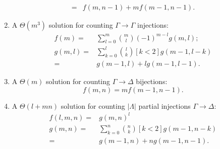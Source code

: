 \documentclass{article}
\begin{document}
\begin{enumerate}
\begin{align*}
          ={}& f(m, n-1) + mf(m-1, n-1).
        \end{align*}
  \item A $\Theta(m^{3})$ solution for counting $\Gamma \to \Gamma$ injections:
        \begin{align*}
          f(m) ={}& \sum_{l=0}^{m} \binom{m}{l} {(-1)}^{m-l} g(m, l); \\
          g(m, l) ={}& \sum_{k=0}^{l} \binom{l}{k} [k < 2] g(m - 1, l - k)\\
          ={}& g(m - 1, l) + lg(m - 1, l - 1).
        \end{align*}
  \item A $\Theta(m)$ solution for counting $\Gamma \to \Delta$ bijections:
        \[
        f(m, n) = mf(m-1, n-1).
        \]
  \item A $\Theta(l+mn)$ solution for counting $|\Lambda|$ partial injections
        $\Gamma \to \Delta$:
        \begin{align*}
          f(l, m, n) ={}& {g(m, n)}^{l}\\
          g(m, n) ={}& \sum_{k=0}^{n}\binom{n}{k} [k < 2] g(m-1, n-k)\\
          ={}& g(m-1, n) + ng(m-1, n-1).
        \end{align*}
\end{enumerate}



\end{document}
